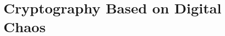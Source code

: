 \chapter{Cryptography Based on Digital Chaos}
\label{Cryptography Based on Digital Chaos}
\minitoc

\section{}

\section{}

\section{}

\section{}

\section{}

\section{}